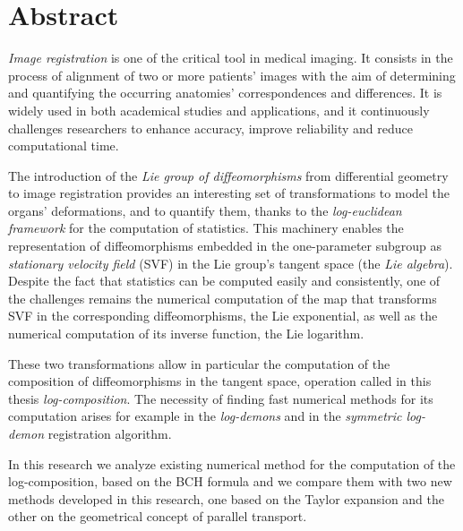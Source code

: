 
\qquad
\pagestyle{empty}
\newpage


\section*{Abstract}

\emph{Image registration} is one of the critical tool in medical imaging. It consists in the process of alignment of two or more patients' images with the aim of determining and quantifying the occurring anatomies' correspondences and differences.
It is widely used in both academical studies and applications, and it continuously challenges researchers to enhance accuracy, improve reliability and reduce computational time.

The introduction of the \emph{Lie group of diffeomorphisms} from differential geometry to image registration provides an interesting set of transformations to model the organs' deformations, and to quantify them, thanks to the \emph{log-euclidean framework} for the computation of statistics.
This machinery enables the representation of diffeomorphisms embedded in the one-parameter subgroup as \emph{stationary velocity field} (SVF) in the Lie group's tangent space (the \emph{Lie algebra}). Despite the fact that statistics can be computed easily and consistently, one of the challenges remains the numerical computation of the map that transforms SVF in the corresponding diffeomorphisms, the Lie exponential, as well as the numerical computation of its inverse function, the Lie logarithm. 

These two transformations allow in particular the computation of the composition of diffeomorphisms in the tangent space, operation called in this thesis \emph{log-composition}. 
The necessity of finding fast numerical methods for its computation arises for example in the \emph{log-demons} and in the \emph{symmetric log-demon} registration algorithm.

In this research we analyze existing numerical method for the computation of the log-composition, based on the BCH formula and we compare them with two new methods developed in this research, one based on the Taylor expansion and the other on the geometrical concept of parallel transport. 

